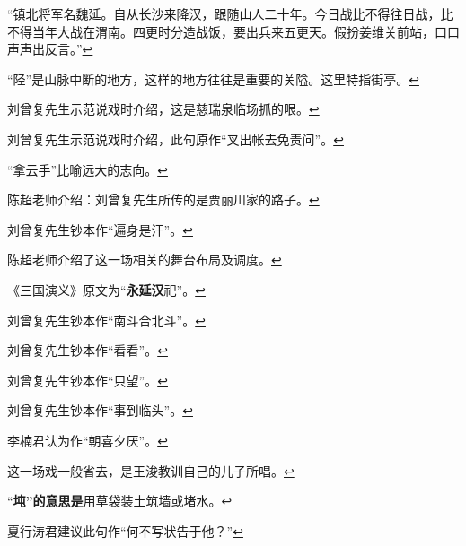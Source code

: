   ``镇北将军名魏延。自从长沙来降汉，跟随山人二十年。今日战比不得往日战，比不得当年大战在渭南。四更时分造战饭，要出兵来五更天。假扮姜维关前站，口口声声出反言。''\protect\hyperlink{fnref280}{↩}
\item
  \leavevmode\hypertarget{fn281}{}%
  ``陉''是山脉中断的地方，这样的地方往往是重要的关隘。这里特指街亭。\protect\hyperlink{fnref281}{↩}
\item
  \leavevmode\hypertarget{fn282}{}%
  刘曾复先生示范说戏时介绍，这是慈瑞泉临场抓的哏。\protect\hyperlink{fnref282}{↩}
\item
  \leavevmode\hypertarget{fn283}{}%
  刘曾复先生示范说戏时介绍，此句原作``叉出帐去免责问''。\protect\hyperlink{fnref283}{↩}
\item
  \leavevmode\hypertarget{fn284}{}%
  ``拿云手''比喻远大的志向。\protect\hyperlink{fnref284}{↩}
\item
  \leavevmode\hypertarget{fn285}{}%
  陈超老师介绍：刘曾复先生所传的是贾丽川家的路子。\protect\hyperlink{fnref285}{↩}
\item
  \leavevmode\hypertarget{fn286}{}%
  刘曾复先生钞本作``遍身是汗''。\protect\hyperlink{fnref286}{↩}
\item
  \leavevmode\hypertarget{fn287}{}%
  陈超老师介绍了这一场相关的舞台布局及调度。\protect\hyperlink{fnref287}{↩}
\item
  \leavevmode\hypertarget{fn288}{}%
  《三国演义》原文为``\textbf{永延汉}祀''。\protect\hyperlink{fnref288}{↩}
\item
  \leavevmode\hypertarget{fn289}{}%
  刘曾复先生钞本作``南斗合北斗''。\protect\hyperlink{fnref289}{↩}
\item
  \leavevmode\hypertarget{fn290}{}%
  刘曾复先生钞本作``看看''。\protect\hyperlink{fnref290}{↩}
\item
  \leavevmode\hypertarget{fn291}{}%
  刘曾复先生钞本作``只望''。\protect\hyperlink{fnref291}{↩}
\item
  \leavevmode\hypertarget{fn292}{}%
  刘曾复先生钞本作``事到临头''。\protect\hyperlink{fnref292}{↩}
\item
  \leavevmode\hypertarget{fn293}{}%
  李楠君认为作``朝喜夕厌''。\protect\hyperlink{fnref293}{↩}
\item
  \leavevmode\hypertarget{fn294}{}%
  这一场戏一般省去，是王浚教训自己的儿子所唱。\protect\hyperlink{fnref294}{↩}
\item
  \leavevmode\hypertarget{fn295}{}%
  ``\textbf{坉''的意思是}用草袋装土筑墙或堵水。\protect\hyperlink{fnref295}{↩}
\item
  \leavevmode\hypertarget{fn296}{}%
  夏行涛君建议此句作``何不写状告于他？''\protect\hyperlink{fnref296}{↩}
